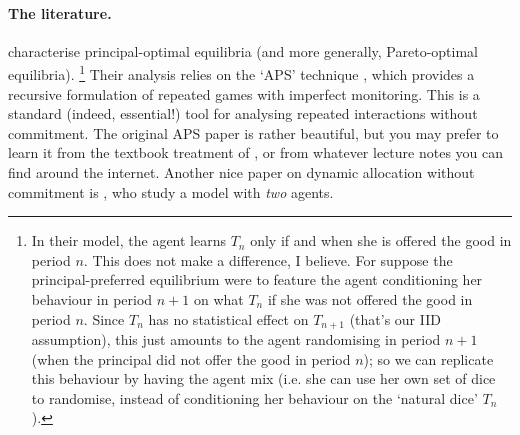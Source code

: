 \paragraph{The literature.} \textcite{LipnowskiRamos2020} characterise principal-optimal equilibria (and more generally, Pareto-optimal equilibria).%
	\footnote{In their model, the agent learns $T_n$ only if and when she is offered the good in period $n$. This does not make a difference, I believe.
	For suppose the principal-preferred equilibrium were to feature the agent conditioning her behaviour in period $n+1$
	on what $T_n$ if she was not offered the good in period $n$.
	Since $T_n$ has no statistical effect on $T_{n+1}$ (that's our IID assumption),
	this just amounts to the agent randomising in period $n+1$ (when the principal did not offer the good in period $n$);
	so we can replicate this behaviour by having the agent mix (i.e. she can use her own set of dice to randomise, instead of conditioning her behaviour on the `natural dice' $T_n$).}
Their analysis relies on the `APS' technique \parencite{AbreuPearceStacchetti1990}, which provides a recursive formulation of repeated games with imperfect monitoring. This is a standard (indeed, essential!) tool for analysing repeated interactions without commitment.
The original APS paper is rather beautiful,
but you may prefer to learn it from the textbook treatment of \textcite{MailathSamuelson2006}, or from whatever lecture notes you can find around the internet.
Another nice paper on dynamic allocation without commitment is \textcite{DeclippelEliazFershtmanRozen2021}, who study a model with \emph{two} agents.

